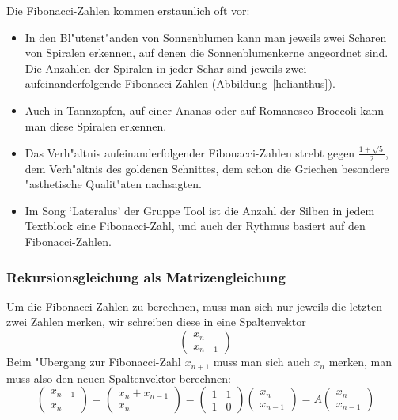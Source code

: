 Die Fibonacci-Zahlen kommen erstaunlich oft vor:
\begin{itemize}
\item In den Bl"utenst"anden von Sonnenblumen kann man jeweils zwei
Scharen von Spiralen erkennen, auf denen die Sonnenblumenkerne angeordnet sind.
Die Anzahlen der Spiralen in jeder Schar sind jeweils zwei aufeinanderfolgende
Fibonacci-Zahlen (Abbildung~\ref{helianthus}).
\item Auch in Tannzapfen, auf einer Ananas oder auf Romanesco-Broccoli
kann man diese Spiralen erkennen.
\item Das Verh"altnis aufeinanderfolgender Fibonacci-Zahlen strebt gegen
$\frac{1+\sqrt{5}}2$, dem Verh"altnis des goldenen Schnittes, dem schon die
Griechen besondere "asthetische Qualit"aten nachsagten.
\item Im Song `Lateralus' der Gruppe Tool ist die Anzahl der Silben
in jedem Textblock eine Fibonacci-Zahl, und auch der Rythmus basiert
auf den Fibonacci-Zahlen.
\end{itemize}

\subsubsection{Rekursionsgleichung als Matrizengleichung}
Um die Fibonacci-Zahlen zu berechnen, muss man sich nur jeweils die letzten zwei
Zahlen merken, wir schreiben diese in eine Spaltenvektor
$$\begin{pmatrix}x_n\\x_{n-1}\end{pmatrix}$$
Beim "Ubergang zur Fibonacci-Zahl $x_{n+1}$ muss man sich auch $x_n$ merken,
man muss also den neuen Spaltenvektor berechnen:
\begin{equation}
\begin{pmatrix}x_{n+1}\\x_n\end{pmatrix}
=
\begin{pmatrix}x_n+x_{n-1}\\x_n\end{pmatrix}
=
\begin{pmatrix}
1&1\\
1&0
\end{pmatrix}
\begin{pmatrix}x_n\\x_{n-1}\end{pmatrix}
=
A
\begin{pmatrix}x_n\\x_{n-1}\end{pmatrix}
\label{fibonaccirekursion}
\end{equation}
